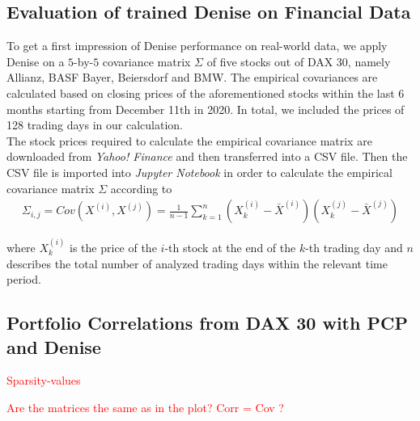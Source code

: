 \subsection{Evaluation of trained Denise on Financial Data}
To get a first impression of Denise performance on real-world data, we apply Denise on a $5$-by-$5$ covariance matrix $\Sigma$ of five stocks out of DAX 30, namely Allianz, BASF Bayer, Beiersdorf and BMW. The empirical covariances are calculated based on closing prices of the aforementioned stocks within the last 6 months starting from December 11th in 2020. In total, we included the prices of 128 trading days in our calculation.\\

The stock prices required to calculate the empirical covariance matrix are downloaded from \textit{Yahoo! Finance} and then transferred into a CSV file. Then the CSV file is imported into \textit{Jupyter Notebook} in order to calculate the empirical covariance matrix $\Sigma$ according to 
\begin{align}
\Sigma_{i,j} = Cov(X^{(i)},X^{(j)}) = \frac{1}{n-1} \sum_{k=1}^{n} (X_{k}^{(i)} - \bar{X}^{(i)}) (X_{k}^{(j)} - \bar{X}^{(j)})
\end{align}

where $X_{k}^{(i)}$ is the price of the $i$-th stock at the end of the $k$-th trading day and $n$ describes the total number of analyzed trading days within the relevant time period.


\subsection{Portfolio Correlations from DAX 30 with PCP and Denise}

\textcolor{red}{Sparsity-values}

\textcolor{red}{Are the matrices the same as in the plot? Corr = Cov ?}

